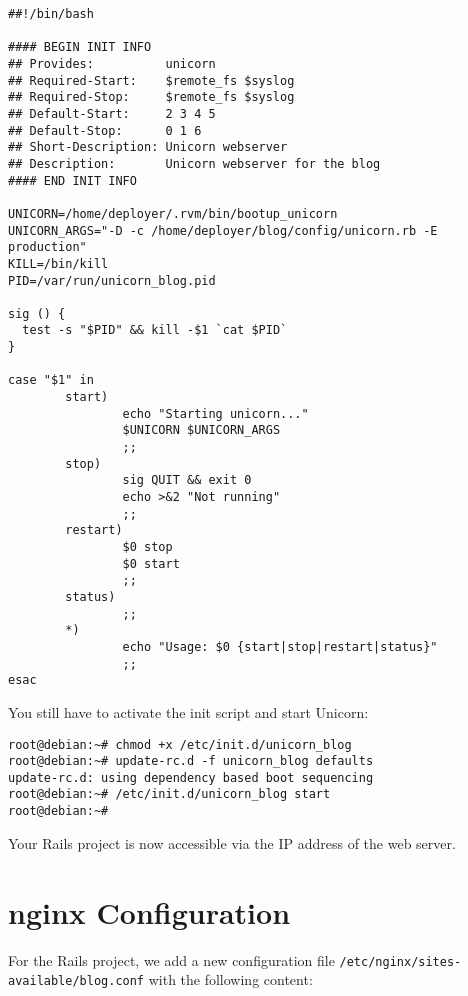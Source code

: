\documentclass[a4paper]{book}
\begin{document}
\begin{shaded}\begin{verbatim}
##!/bin/bash

#### BEGIN INIT INFO
## Provides:          unicorn
## Required-Start:    $remote_fs $syslog
## Required-Stop:     $remote_fs $syslog
## Default-Start:     2 3 4 5
## Default-Stop:      0 1 6
## Short-Description: Unicorn webserver
## Description:       Unicorn webserver for the blog
#### END INIT INFO

UNICORN=/home/deployer/.rvm/bin/bootup_unicorn
UNICORN_ARGS="-D -c /home/deployer/blog/config/unicorn.rb -E production"
KILL=/bin/kill
PID=/var/run/unicorn_blog.pid

sig () {
  test -s "$PID" && kill -$1 `cat $PID`
}

case "$1" in
        start)
                echo "Starting unicorn..."
                $UNICORN $UNICORN_ARGS
                ;;
        stop)
                sig QUIT && exit 0
                echo >&2 "Not running"
                ;;
        restart)
                $0 stop
                $0 start
                ;;
        status)
                ;;
        *)
                echo "Usage: $0 {start|stop|restart|status}"
                ;;
esac
\end{verbatim}\end{shaded}

You still have to activate the init script and start Unicorn:

\begin{shaded}\begin{verbatim}
root@debian:~# chmod +x /etc/init.d/unicorn_blog
root@debian:~# update-rc.d -f unicorn_blog defaults
update-rc.d: using dependency based boot sequencing
root@debian:~# /etc/init.d/unicorn_blog start
root@debian:~#
\end{verbatim}\end{shaded}

Your Rails project is now accessible via the IP address of the web server.

\section{nginx Configuration}\label{nginx-configuration}

For the Rails project, we add a new configuration file \texttt{/etc/nginx/sites-available/blog.conf} with the following content:
\end{document}
